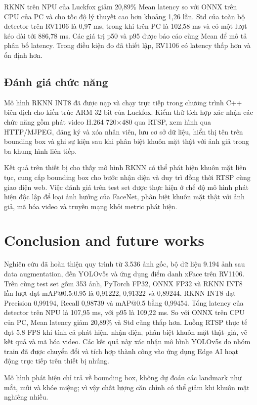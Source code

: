 \documentclass[11pt,a4paper]{article}
\begin{document}
RKNN trên NPU của Luckfox giảm 20,89\% Mean latency so với ONNX trên CPU của PC và cho tốc độ lý thuyết cao hơn khoảng 1,26 lần. Std của toàn bộ detector trên RV1106 là 0,97 ms, trong khi trên PC là 102,58 ms và có một lượt kéo dài tới 886,78 ms. Các giá trị p50 và p95 được báo cáo cùng Mean để mô tả phân bố latency. Trong điều kiện đo đã thiết lập, RV1106 có latency thấp hơn và ổn định hơn.

\subsection{Đánh giá chức năng}

Mô hình RKNN INT8 đã được nạp và chạy trực tiếp trong chương trình C++ biên dịch cho kiến trúc ARM 32 bit của Luckfox. Kiểm thử tích hợp xác nhận các chức năng gồm phát video H.264 720$\times$480 qua RTSP, xem hình qua HTTP/MJPEG, đăng ký và xóa nhân viên, lưu cơ sở dữ liệu, hiển thị tên trên bounding box và ghi sự kiện sau khi phân biệt khuôn mặt thật với ảnh giả trong ba khung hình liên tiếp.

Kết quả trên thiết bị cho thấy mô hình RKNN có thể phát hiện khuôn mặt liên tục, cung cấp bounding box cho bước nhận diện và duy trì đồng thời RTSP cùng giao diện web. Việc đánh giá trên test set được thực hiện ở chế độ mô hình phát hiện độc lập để loại ảnh hưởng của FaceNet, phân biệt khuôn mặt thật với ảnh giả, mã hóa video và truyền mạng khỏi metric phát hiện.

\section{Conclusion and future works}

Nghiên cứu đã hoàn thiện quy trình từ 3.536 ảnh gốc, bộ dữ liệu 9.194 ảnh sau data augmentation, đến YOLOv5s và ứng dụng điểm danh xFace trên RV1106. Trên cùng test set gồm 353 ảnh, PyTorch FP32, ONNX FP32 và RKNN INT8 lần lượt đạt mAP@0.5:0.95 là 0,91222, 0,91322 và 0,89244. RKNN INT8 đạt Precision 0,99194, Recall 0,98739 và mAP@0.5 bằng 0,99454. Tổng latency của detector trên NPU là 107,95 ms, với p95 là 109,22 ms. So với ONNX trên CPU của PC, Mean latency giảm 20,89\% và Std cũng thấp hơn. Luồng RTSP thực tế đạt 5,8 FPS khi tính cả phát hiện, nhận diện, phân biệt khuôn mặt thật--giả, vẽ kết quả và mã hóa video. Các kết quả này xác nhận mô hình YOLOv5s do nhóm train đã được chuyển đổi và tích hợp thành công vào ứng dụng Edge AI hoạt động trực tiếp trên thiết bị nhúng.

Mô hình phát hiện chỉ trả về bounding box, không dự đoán các landmark như mắt, mũi và khóe miệng; vì vậy chất lượng căn chỉnh có thể giảm khi khuôn mặt nghiêng nhiều.
\end{document}
